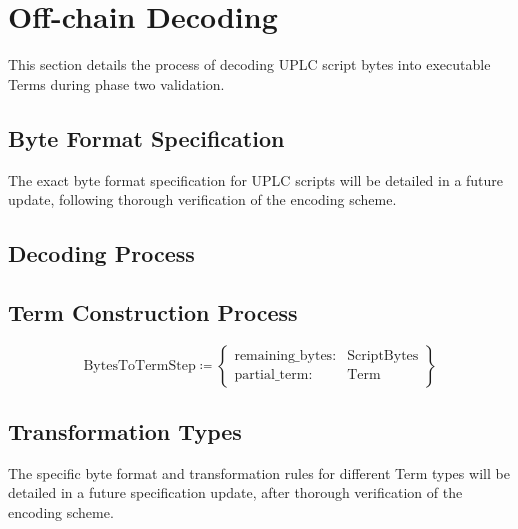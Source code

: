 \documentclass[../midgard.tex]{subfiles}
\begin{document}
\section{Off-chain Decoding}
\label{s:phase-two-decoding-off-chain}

This section details the process of decoding UPLC script bytes into executable Terms during phase two validation.

\subsection{Byte Format Specification}

The exact byte format specification for UPLC scripts will be detailed in a future update, following thorough verification of the encoding scheme.

\subsection{Decoding Process}

\subsection{Term Construction Process}

\begin{equation*}
    \text{BytesToTermStep} \coloneq \left\{
    \begin{array}{ll}
        \text{remaining\_bytes} : & \text{ScriptBytes} \\
        \text{partial\_term} : & \text{Term}
    \end{array} \right\}
\end{equation*}

\subsection{Transformation Types}

The specific byte format and transformation rules for different Term types will be detailed in a future specification update, after thorough verification of the encoding scheme.
\end{document}
